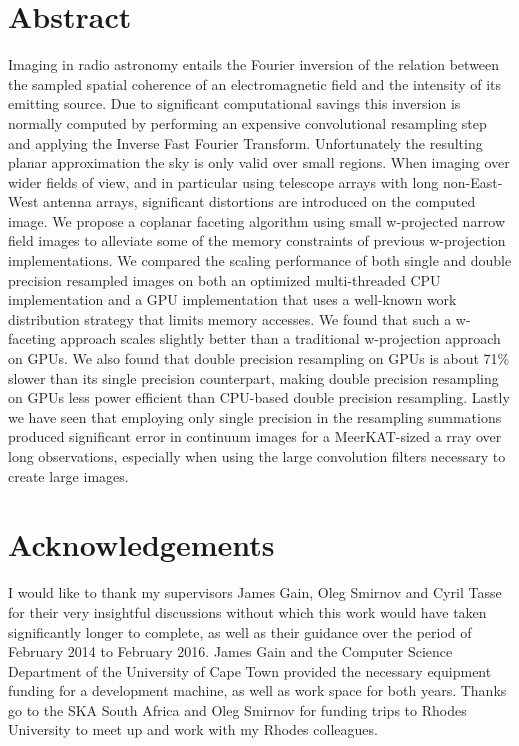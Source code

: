 \chapter*{Abstract}
 Imaging in radio astronomy entails the Fourier inversion of the relation between the sampled spatial coherence of an electromagnetic field and the intensity of its 
 emitting source. Due to significant computational savings this inversion is normally computed by performing an expensive convolutional resampling step and applying 
 the Inverse Fast Fourier Transform. Unfortunately the resulting planar approximation the sky is only valid over small regions. When imaging over wider fields of view,
 and in particular using telescope arrays with long non-East-West antenna arrays, significant distortions are introduced on the computed image. We propose a coplanar faceting
 algorithm using small w-projected narrow field images to alleviate some of the memory constraints of previous w-projection implementations. We compared the scaling performance of
 both single and double precision resampled images on both an optimized multi-threaded CPU implementation and a GPU implementation that uses a well-known work distribution strategy
 that limits memory accesses. We found that such a w-faceting approach scales slightly better than a traditional w-projection approach on GPUs. We also found that
 double precision resampling on GPUs is about 71\% slower than its single precision counterpart, making double precision resampling on GPUs less power efficient than CPU-based double 
 precision resampling. Lastly we have seen that employing only single precision in the resampling summations produced significant error in continuum images for a MeerKAT-sized a
 rray over long observations, especially when using the large convolution filters necessary to create large images.
 
\chapter*{Acknowledgements}
 I would like to thank my supervisors James Gain, Oleg Smirnov and Cyril Tasse for their very insightful discussions without which this work would have taken significantly longer to complete, as well as 
 their guidance over the period of February 2014 to February 2016. James Gain and the Computer Science Department of the University of Cape Town provided the necessary equipment funding for a 
 development machine, as well as work space for both years. Thanks go to the SKA South Africa and Oleg Smirnov for funding trips to Rhodes University to meet up and work with my Rhodes colleagues.
 

